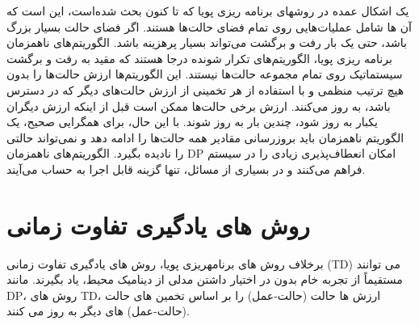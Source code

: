 %
%
%
یک اشکال عمده در روشهای برنامه ریزی پویا که تا کنون بحث شده‌است، این است که آن ها شامل عملیات‌هایی روی تمام فضای حالت‌ها هستند.
اگر فضای حالت بسیار بزرگ باشد،
حتی یک بار رفت و برگشت می‌تواند بسیار پرهزینه باشد.
الگوریتم‌های ناهمزمان برنامه ریزی پویا، الگوریتم‌های تکرار شونده درجا هستند که مقید به رفت و برگشت سیستماتیک روی تمام مجموعه حالت‌ها نیستند. این الگوریتم‌ها ارزش حالت‌ها را بدون هیچ ترتیب منظمی ‌و با استفاده از هر تخمینی از ارزش حالت‌های دیگر که در دسترس باشد، به روز می‌کنند.
 ارزش برخی حالت‌ها ممکن است قبل از اینکه ارزش دیگران یکبار به روز شود، چندین بار به روز شوند. با این حال، برای همگرایی صحیح، یک الگوریتم ناهمزمان باید بروزرسانی مقادیر همه حالت‌ها را ادامه دهد و نمی‌تواند حالتی را نادیده بگیرد.
الگوریتم‌های ناهمزمان DP امکان انعطاف‌پذیری زیادی را در سیستم فراهم می‌کنند و در بسیاری از مسائل، تنها گزینه قابل اجرا به حساب می‌آیند.

\section{روش های یادگیری تفاوت زمانی}
برخلاف روش های برنامه\nf ریزی پویا، روش های 
{یادگیری تفاوت زمانی} (TD) می توانند مستقیماً از تجربه خام بدون در اختیار داشتن مدلی از دینامیک محیط، یاد بگیرند. مانند DP، روش های TD، ارزش ها حالت  (حالت-عمل) را بر اساس تخمین های حالت (حالت-عمل)  های دیگر به روز می کنند.




